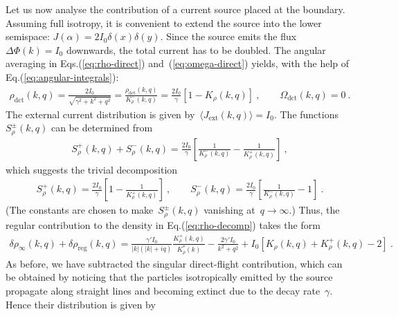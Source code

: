 \documentclass[preprint,aps,eqsecnum, prb]{revtex4-1}
\newcommand{\fplus}[1]{{#1}^{+}}
\newcommand{\fminus}[1]{{#1}^{-}}
\newcommand{\fplusminus}[1]{{#1}^{\pm}}
\newcommand{\dct}[1]{{#1}_\mathrm{dct}}
\begin{document}
Let us now analyse the contribution of a current source placed at the boundary.
Assuming full isotropy, it is convenient to
extend the source into the lower semispace:
$J(\alpha) = 2I_0 \delta(x) \delta(y)$. Since the source
emits the flux~$\Delta \Phi(k) = I_0$ downwards, the total
current has to be doubled.
The angular averaging in Eqs.(\ref{eq:rho-direct}) and~(\ref{eq:omega-direct})
yields, with the help of Eq.(\ref{eq:angular-integrals}):
\begin{align}
  \label{eq:I-src-rho-omega}
  \dct{\rho}(k, q) = \frac{2I_0}{\sqrt{\gamma^2 + k^2 + q^2}} =
  \frac{\dct{\rho}(k, q)}{\fminus{K}_\rho(k, q)} =
  \frac{2I_0}{\gamma} \left[1 - K_\rho(k, q)\right]\ ,
  \qquad
  \dct{\Omega}(k, q) = 0\ .
\end{align}
The external current distribution is
given by~$\langle J_\mathrm{ext}(k, q) \rangle = I_0$.
The functions~$\fplusminus{S}_\rho(k, q)$ can be determined from
\begin{align}
    \fplus{S}_\rho(k, q)
 +  \fminus{S}_\rho(k, q)
  = \frac{2I_0}{\gamma} \left[\frac{1}{\fminus{K}_\rho(k, q)}
  - \frac{1}{\fplus{K}_\rho(k, q)}\right]\ ,
\end{align}
which suggests the trivial decomposition
\begin{align}
  \label{eq:iso-chi}
  \fplus{S}_\rho(k, q) = \frac{2I_0}{\gamma}
  \left[1 - \frac{1}{\fplus{K}_\rho(k, q)}\right]\ ,
  \qquad
  \fminus{S}_\rho(k, q) = \frac{2I_0}{\gamma}
  \left[\frac{1}{\fminus{K}_\rho(k, q)} - 1\right]\ .
\end{align}
(The constants are chosen to make~$\fplusminus{S}_\rho(k, q)$
vanishing at~$q\to\infty$.) Thus, the regular contribution
to the density in Eq.(\ref{eq:rho-decomp}) takes the form
\begin{align}
  \label{eq:iso-rho-reg}
  \delta\rho_\infty(k, q) + \delta\rho_\mathrm{reg}(k, q) =
  \frac{\gamma' I_0}{|k|(|k| + iq)} \frac{\fplus{K}_\rho(k, q)}{
  K^\ast_{\rho}(k)}
  - \frac{2\gamma' I_0}{k^2 + q^2}
  + I_0 \left[K_\rho(k, q) + \fplus{K}_\rho(k, q) - 2\right] \ .
\end{align}
As before, we have subtracted the singular direct-flight contribution,
which can be obtained by noticing that the particles isotropically emitted by
the source propagate along straight lines and becoming extinct due
to the decay rate~$\gamma$. Hence their distribution is given by
\end{document}
